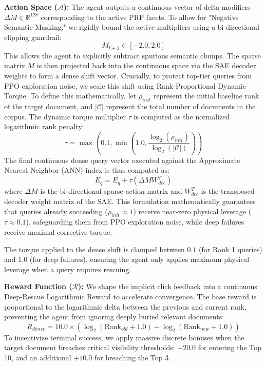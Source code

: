 \textbf{Action Space ($\mathcal{A}$):} The agent outputs a continuous vector of delta modifiers $\Delta M \in \mathbb{R}^{128}$ corresponding to the active PRF facets. To allow for "Negative Semantic Masking," we rigidly bound the active multipliers using a bi-directional clipping guardrail:
\begin{equation}
M_{t+1} \in [-2.0, 2.0]
\end{equation}
This allows the agent to explicitly subtract spurious semantic clumps. The sparse matrix $M$ is then projected back into the continuous space via the SAE decoder weights to form a dense shift vector. Crucially, to protect top-tier queries from PPO exploration noise, we scale this shift using Rank-Proportional Dynamic Torque. To define this mathematically, let $\rho_{init}$ represent the initial baseline rank of the target document, and $|\mathcal{C}|$ represent the total number of documents in the corpus. The dynamic torque multiplier $\tau$ is computed as the normalized logarithmic rank penalty:
\begin{equation}
\tau = \max\left(0.1, \min\left(1.0, \frac{\log_2(\rho_{init})}{\log_2(|\mathcal{C}|)}\right)\right)
\end{equation}
The final continuous dense query vector executed against the Approximate Nearest Neighbor (ANN) index is thus computed as:
\begin{equation}
E_q^{\prime} = E_q + \tau (\Delta M W_{dec}^T)
\end{equation}
where $\Delta M$ is the bi-directional sparse action matrix and $W_{dec}^T$ is the transposed decoder weight matrix of the SAE. This formulation mathematically guarantees that queries already succeeding ($\rho_{init} \approx 1$) receive near-zero physical leverage ($\tau \approx 0.1$), safeguarding them from PPO exploration noise, while deep failures receive maximal corrective torque.

The torque applied to the dense shift is clamped between $0.1$ (for Rank 1 queries) and $1.0$ (for deep failures), ensuring the agent only applies maximum physical leverage when a query requires rescuing.

\textbf{Reward Function ($\mathcal{R}$):} We shape the implicit click feedback into a continuous Deep-Rescue Logarithmic Reward to accelerate convergence. The base reward is proportional to the logarithmic delta between the previous and current rank, preventing the agent from ignoring deeply buried relevant documents:
\begin{equation}
R_{dense} = 10.0 \times (\log_2(\text{Rank}_{old} + 1.0) - \log_2(\text{Rank}_{new} + 1.0))
\end{equation}
To incentivize terminal success, we apply massive discrete bonuses when the target document breaches critical visibility thresholds: $+20.0$ for entering the Top 10, and an additional $+10.0$ for breaching the Top 3.

